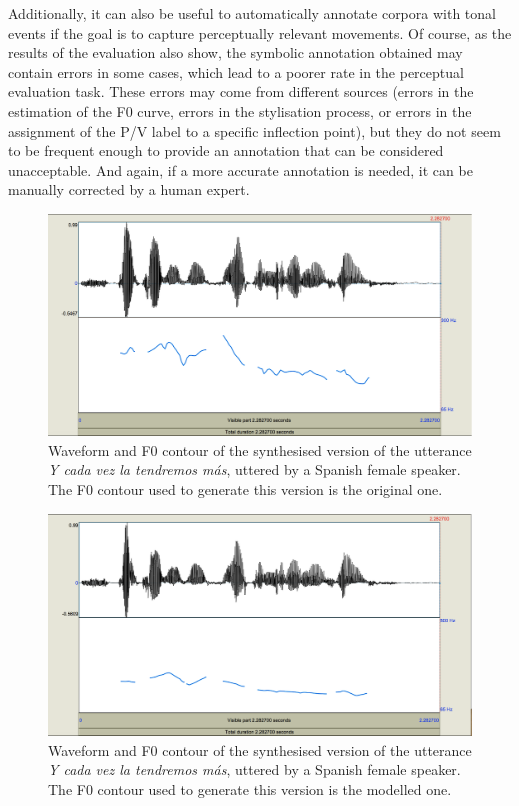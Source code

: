 \documentclass[output=paper]{langsci/langscibook}
\begin{document}
Additionally, it can also be useful to automatically annotate  corpora with tonal events if the goal is to capture perceptually relevant movements. Of course, as the results of the evaluation also show, the symbolic annotation obtained may contain errors in some cases, which lead to a poorer rate in the perceptual evaluation task. These errors may come from different sources (errors in the estimation of the F0 curve, errors in the stylisation process, or errors in the assignment of the P/V label to a specific inflection point), but they do not seem to be frequent enough to provide an annotation that can be considered unacceptable. And again, if a more accurate annotation is needed, it can be manually corrected by a human expert.

 \begin{figure}[p]
\includegraphics[width=\textwidth]{figures/GAR-img005.png}
\caption{Waveform and F0 contour of the synthesised version of the utterance \textit{Y cada vez la tendremos más}, uttered by a Spanish female speaker. The F0 contour used to generate this version is the original one.}
\label{fig:gar:5}
\end{figure}

 
\begin{figure}[p]
\includegraphics[width=\textwidth]{figures/GAR-img006.png}
\caption{Waveform and F0 contour of the synthesised version of the utterance \textit{Y cada vez la tendremos más}, uttered by a Spanish female speaker. The F0 contour used to generate this version is the modelled one.}
\label{fig:gar:6}
\end{figure}
\end{document}
